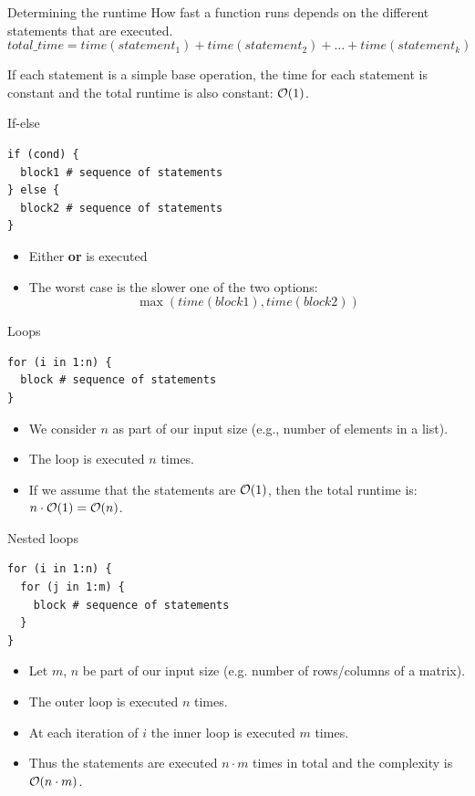 \documentclass[11pt,compress,t,notes=noshow, xcolor=table]{beamer}
\begin{document}
\begin{vbframe}{Determining the runtime}
How fast a function runs depends on the different statements that are executed.
$$
total\_time = time(statement_1) + time(statement_2) + \ldots + time(statement_k)
$$

If each statement is a simple base operation, the time for each
statement is constant and the total runtime is also constant: $\mathcal{O}(1)$.

\framebreak

\begin{block}{If-else}
\begin{verbatim}
if (cond) {
  block1 # sequence of statements
} else {
  block2 # sequence of statements
}
\end{verbatim}

\begin{itemize}
  \item Either  \textbf{or}  is executed
  \item The worst case is the slower one of the two options:
  $$
  \max(time(block1), time(block2))
  $$
\end{itemize}
\end{block}

\framebreak

\begin{block}{Loops}
\begin{verbatim}
for (i in 1:n) {
  block # sequence of statements
}
\end{verbatim}

\begin{itemize}
  \item We consider $n$ as part of our input size (e.g., number of elements in a list).
  \item The loop is executed $n$ times.
  \item If we assume that the statements are $\mathcal{O}(1)$, then the total runtime is: $n \cdot \mathcal{O}(1) = \mathcal{O}(n)$.
\end{itemize}
\end{block}

\framebreak

\begin{block}{Nested loops}
\begin{verbatim}
for (i in 1:n) {
  for (j in 1:m) {
    block # sequence of statements
  }
}
\end{verbatim}

\begin{itemize}
  \item Let $m$, $n$ be part of our input size (e.g. number of rows/columns of a matrix).
  \item The outer loop is executed $n$ times.
  \item At each iteration of $i$ the inner loop is executed $m$ times.
  \item Thus the statements are executed $n \cdot m$ times in total and the complexity is $\mathcal{O}(n \cdot m)$.
\end{itemize}
\end{block}


\end{vbframe}
\end{document}
